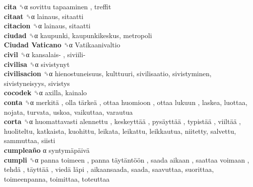 \textbf{cita} ␝α   sovittu tapaaminen , treffit  \\
\textbf{citaat} ␝α  lainaus, sitaatti  \\
\textbf{citacion} ␝α  lainaus, sitaatti  \\
\textbf{ciudad} ␝α  kaupunki, kaupunkikeskus, metropoli  \\
\textbf{Ciudad Vaticano} ␝α   Vatikaanivaltio   \\
\textbf{civil} ␝α   kansalais- ,  siviili-   \\
\textbf{civilisa} ␝α  sivistynyt  \\
\textbf{civilisacion} ␝α  hienostuneisuus, kulttuuri, sivilisaatio, sivistyminen, sivistyneisyys, sivistys  \\
\textbf{cocodek} ␝α  axilla, kainalo  \\
\textbf{conta} ␝α   merkitä ,  olla tärkeä ,  ottaa huomioon ,  ottaa lukuun , laskea, luottaa, nojata, turvata, uskoa, vaikuttaa, varautua  \\
\textbf{corta} ␝α   huomattavasti alennettu ,  keskeyttää ,  pysäyttää ,  typistää ,  viiltää , huoliteltu, katkaista, kuohittu, leikata, leikattu, leikkautua, niitetty, salvettu, sammuttaa, siisti  \\
\textbf{cumpleaño} α   syntymäpäivä   \\
\textbf{cumpli} ␝α   panna toimeen ,  panna täytäntöön ,  saada aikaan ,  saattaa voimaan ,  tehdä ,  täyttää ,  viedä läpi , aikaansaada, saada, saavuttaa, suorittaa, toimeenpanna, toimittaa, toteuttaa  \\
